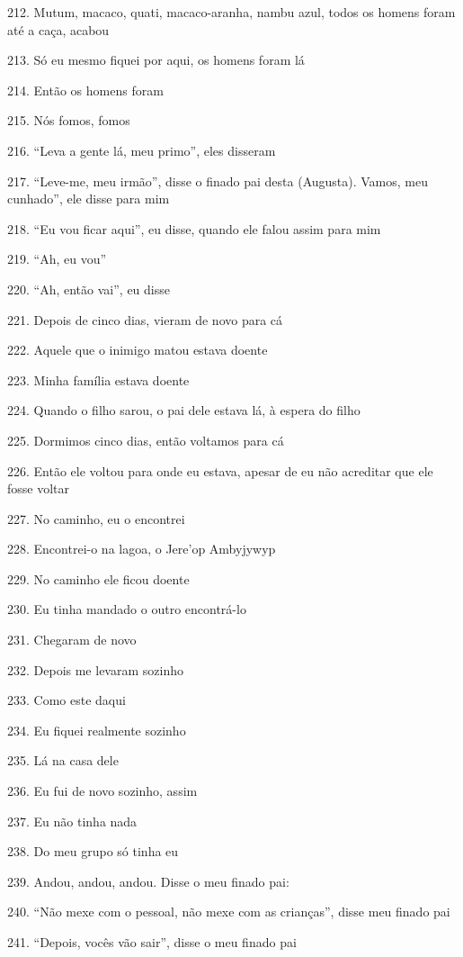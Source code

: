 212. Mutum, macaco, quati, macaco-aranha, nambu azul, todos os homens
foram até a caça, acabou

213. Só eu mesmo fiquei por aqui, os homens foram lá

214. Então os homens foram

215. Nós fomos, fomos

216. ``Leva a gente lá, meu primo'', eles disseram

217. ``Leve-me, meu irmão'', disse o finado pai desta (Augusta).  Vamos,
meu cunhado'', ele disse para mim

218. ``Eu vou ficar aqui'', eu disse, quando ele falou assim para mim

219. ``Ah, eu vou''

220. ``Ah, então vai'', eu disse

221. Depois de cinco dias, vieram de novo para cá

222. Aquele que o inimigo matou estava doente

223. Minha família estava doente

224. Quando o filho sarou, o pai dele estava lá, à espera do filho

225. Dormimos cinco dias, então voltamos para cá

226. Então ele voltou para onde eu estava, apesar de eu não acreditar que
ele fosse voltar

227. No caminho, eu o encontrei

228. Encontrei-o na lagoa, o Jere'op Ambyjywyp

229. No caminho ele ficou doente

230. Eu tinha mandado o outro encontrá-lo

231. Chegaram de novo

232. Depois me levaram sozinho

233. Como este daqui

234. Eu fiquei realmente sozinho

235. Lá na casa dele

236. Eu fui de novo sozinho, assim

237. Eu não tinha nada

238. Do meu grupo só tinha eu

239. Andou, andou, andou. Disse o meu finado pai:

240. ``Não mexe com o pessoal, não mexe com as crianças'', disse meu finado pai

241. ``Depois, vocês vão sair'', disse o meu finado pai

